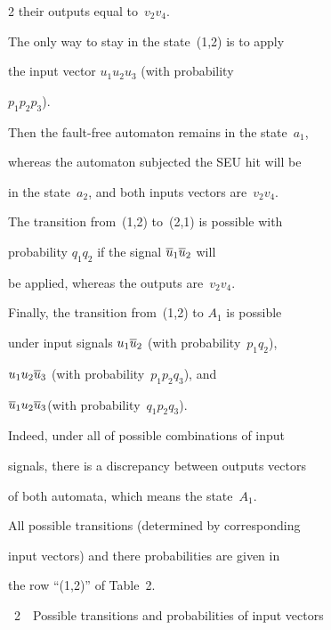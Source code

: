 \begin{multicols}{2}
their outputs equal to~$v_2v_4$.



The only way to stay in the state~(1,2) is to apply

the input vector $u_1u_2u_3$ (with probability

$p_1p_2p_3$).

Then the fault-free automaton remains in the state~$a_1$,

whereas the automaton subjected the SEU hit will be

in the state~$a_2$, and both inputs vectors are~$v_2v_4$.



The transition from~(1,2) to~(2,1) is possible with

probability $q_1q_2$ if the signal $\overline u_1\overline u_2$ will

be applied, whereas the outputs are~$v_2v_4$.



Finally, the transition from~(1,2) to $A_1$ is possible

under input signals $u_1\overline u_2$ (with probability~$p_1q_2$),

$u_1u_2\overline u_3$ (with probability~$p_1p_2q_3$), and

$\overline u_1u_2\overline u_3$(with probability~$q_1p_2q_3$).



Indeed, under all of possible combinations of input

signals, there is a discrepancy between outputs vectors

of both automata, which means the state~$A_1$.

All possible transitions (determined by corresponding

input vectors) and there probabilities are given in

the row ``(1,2)'' of Table~2.



\bigskip



\begin{center} %


{{\tablename~2}\ \ \small{Possible transitions and probabilities of input vectors}}

\vspace*{2ex}



{\small

\tabcolsep=8.6pt

}
\end{center}
\end{multicols}
